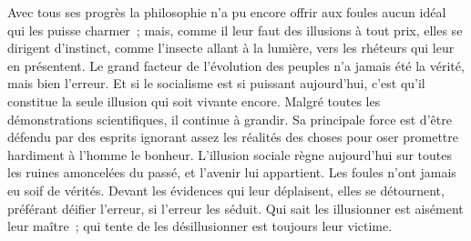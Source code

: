 \documentclass[french,twoside]{book} %
\begin{document}
Avec tous ses progrès la philosophie n’a pu encore offrir aux foules aucun idéal qui les puisse charmer ; mais, comme il leur faut des illusions à tout prix, elles se dirigent d’instinct, comme l’insecte allant à la lumière, vers les rhéteurs qui leur en présentent. Le grand facteur de l’évolution des peuples n’a jamais été la vérité, mais bien l’erreur. Et si le socialisme est si puissant aujourd’hui, c’est qu’il constitue la seule illusion qui soit vivante encore. Malgré toutes les démonstrations scientifiques, il continue à grandir. Sa principale force est d’être défendu par des esprits ignorant assez les réalités des choses pour oser promettre hardiment à l’homme le bonheur. L’illusion sociale règne aujourd’hui sur toutes les ruines amoncelées du passé, et l’avenir lui appartient. Les foules n’ont jamais eu soif de vérités. Devant les évidences qui leur déplaisent, elles se détournent, préférant déifier l’erreur, si l’erreur les séduit. Qui sait les illusionner est aisément leur maître ; qui tente de les désillusionner est toujours leur victime.
\end{document}
